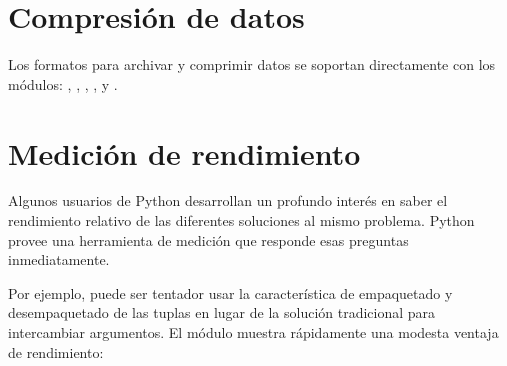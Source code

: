 \documentclass[a5paper,10pt,spanish]{sphinxmanual}
\begin{document}
\section{Compresión de datos}
\label{\detokenize{tutorial/stdlib:data-compression}}\label{\detokenize{tutorial/stdlib:tut-data-compression}}
\sphinxAtStartPar
Los formatos para archivar y comprimir datos se soportan directamente con los módulos: , , , ,  y .

\begin{sphinxVerbatim}[commandchars=\\\{\}]
 
  
  
\end{sphinxVerbatim}


\section{Medición de rendimiento}
\label{\detokenize{tutorial/stdlib:performance-measurement}}\label{\detokenize{tutorial/stdlib:tut-performance-measurement}}
\sphinxAtStartPar
Algunos usuarios de Python desarrollan un profundo interés en saber el rendimiento relativo de las diferentes soluciones al mismo problema.  Python provee una herramienta de medición que responde esas preguntas inmediatamente.

\sphinxAtStartPar
Por ejemplo, puede ser tentador usar la característica de empaquetado y desempaquetado de las tuplas en lugar de la solución tradicional para intercambiar argumentos.  El módulo  muestra rápidamente una modesta ventaja de rendimiento:
\end{document}
